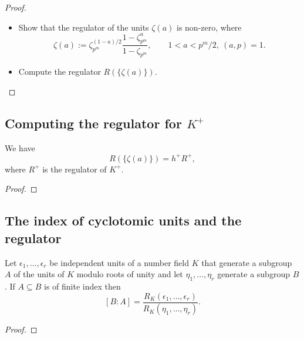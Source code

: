 \begin{proof}
    \begin{itemize}
        \item Show that the regulator of the units $\zeta(a)$ is non-zero, where 
        $$
        \zeta(a) := \zeta_{p^m}^{(1-a)/2} \frac{1 - \zeta_{p^m}^a}{1 - \zeta_{p^m}}, \qquad 1 < a < p^m / 2, \ (a, p) = 1.
        $$
        \item Compute the regulator $R(\{\zeta(a)\})$. 
    \end{itemize}
\end{proof}

\subsection{Computing the regulator for $K^+$}

\begin{lemma}\label{lem:reg_Ra}
    We have 
    $$
    R(\{\zeta(a)\}) = h^+ R^+, 
    $$
    where $R^+$ is the regulator of $K^+$.
\end{lemma}

\begin{proof}
\end{proof}

\subsection{The index of cyclotomic units and the regulator}

\begin{lemma}\label{lem:index_eq_reg_ratio}
    Let $\epsilon_1, \dots, \epsilon_r$ be independent units of a number field $K$ that generate a subgroup 
    $A$ of the units of $K$ modulo roots of unity and let $\eta_1, \dots, \eta_r$ generate a subgroup 
    $B$. If $A \subseteq B$ is of finite index then 
    $$
        [B : A] = \frac{R_K(\epsilon_1, \dots, \epsilon_r)}{R_K(\eta_1, \dots, \eta_r)}.
    $$
\end{lemma}

\begin{proof}
\end{proof}